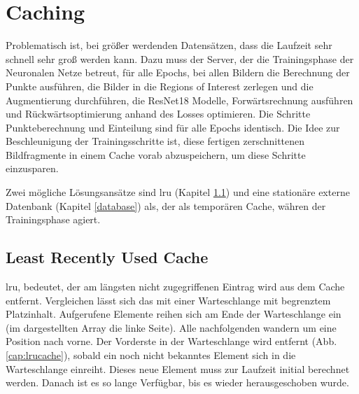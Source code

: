 \clearpage
\section{Caching}\label{caching}
Problematisch ist, bei größer werdenden Datensätzen, dass die Laufzeit sehr schnell sehr groß werden kann. Dazu muss der Server, der die Trainingsphase der Neuronalen Netze betreut, für alle Epochs, bei allen Bildern die Berechnung der Punkte ausführen, die Bilder in die Regions of Interest zerlegen und die Augmentierung durchführen, die ResNet18 Modelle, Forwärtsrechnung ausführen und Rückwärtsoptimierung anhand des Losses optimieren. Die Schritte Punkteberechnung und Einteilung sind für alle Epochs identisch. Die Idee zur Beschleunigung der Trainingsschritte ist, diese fertigen zerschnittenen Bildfragmente in einem Cache vorab abzuspeichern, um diese Schritte einzusparen.

Zwei mögliche Lösungsansätze sind \ac{lru} (Kapitel \ref{lrucache}) und eine stationäre externe Datenbank (Kapitel \ref{database}) als, der als temporären Cache, währen der Trainingsphase agiert.

\subsection{Least Recently Used Cache}\label{lrucache}
\ac{lru}, bedeutet, der am längsten nicht zugegriffenen Eintrag wird aus dem Cache entfernt. Vergleichen lässt sich das mit einer Warteschlange mit begrenztem Platzinhalt. Aufgerufene Elemente reihen sich am Ende der Warteschlange ein (im dargestellten Array die linke Seite). Alle nachfolgenden wandern um eine Position nach vorne. Der Vorderste in der Warteschlange wird entfernt (Abb. \ref{cap:lrucache}), sobald ein noch nicht bekanntes Element sich in die Warteschlange einreiht. Dieses neue Element muss zur Laufzeit initial berechnet werden. Danach ist es so lange Verfügbar, bis es wieder herausgeschoben wurde.

